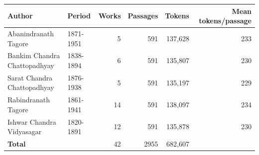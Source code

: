 \begin{tabular}{llrrrr}
\toprule
Author & Period & Works & Passages & Tokens & Mean tokens/passage \\
\midrule
Abanindranath Tagore & 1871-1951 & 5 & 591 & 137,628 & 233 \\
Bankim Chandra Chattopadhyay & 1838-1894 & 6 & 591 & 135,807 & 230 \\
Sarat Chandra Chattopadhyay & 1876-1938 & 5 & 591 & 135,197 & 229 \\
Rabindranath Tagore & 1861-1941 & 14 & 591 & 138,097 & 234 \\
Ishwar Chandra Vidyasagar & 1820-1891 & 12 & 591 & 135,878 & 230 \\
\midrule
\textbf{Total} & & 42 & 2955 & 682,607 & \\
\bottomrule
\end{tabular}
